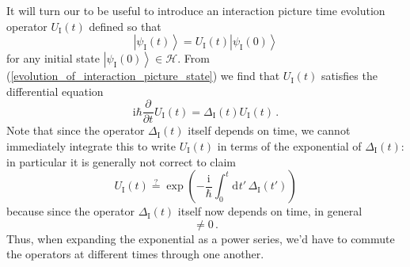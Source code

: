 \documentclass{article}
\theoremstyle{plain}\theoremheaderfont{\normalfont\itshape}\theorembodyfont{\rmfamily}\theoremseparator{.}\newtheorem*{rem}{Remark}\newtheorem*{ex}{Example}\newtheorem*{proof}{Proof}\newtheorem*{altp}{Alternative proof}
\theoremstyle{plain}\theoremheaderfont{\normalfont\bfseries}\theorembodyfont{\rmfamily}\theoremseparator{.}\newtheorem{thm}{Theorem}[section]\newtheorem{lem}[thm]{Lemma}\newtheorem{prop}[thm]{Proposition}\newtheorem*{cor}{Corollary}\newtheorem{defn}[thm]{Definition}\newtheorem{clm}[thm]{Claim}\newtheorem{clminproof}{Claim}
\theoremstyle{break}\theoremheaderfont{\normalfont\itshape}\theorembodyfont{\rmfamily}\theoremseparator{.\medskip}\newtheorem*{proofskip}{Proof}\newtheorem*{exs}{Examples}\newtheorem*{rems}{Remarks}
\theoremstyle{break}\theoremheaderfont{\normalfont\bfseries}\theorembodyfont{\rmfamily}\theoremseparator{.\medskip}\newtheorem{lemskip}[thm]{Lemma}\newtheorem{defnskip}[thm]{Definition}\newtheorem{propskip}[thm]{Proposition}\newtheorem{thmskip}[thm]{Theorem}
\numberwithin{equation}{section}
\newcommand{\ii}{\mathrm{i}}
\newcommand{\dd}[2][]{\mathrm{d}^{#1} #2\,}
\newcommand{\pdv}[3][]{\frac{\partial^{#1} #2}{{\partial #3}^{#1}}}
\newcommand{\ket}[1]{\left| #1 \right\rangle}
\newcommand{\hb}{\mathcal{H}}
\newcommand{\I}{_{\mathrm{I}}}
\begin{document}
    It will turn our to be useful to introduce an interaction picture time evolution operator \(U\I(t)\) defined so that
    \begin{equation}
        \ket{\psi\I(t)}=U\I(t)\ket{\psi\I(0)}
    \end{equation}
    for any initial state \(\ket{\psi\I(0)}\in\hb\). From (\ref{evolution_of_interaction_picture_state}) we find that \(U\I(t)\) satisfies the differential equation
    \begin{equation}\label{UI_DE}
        \ii\hbar\pdv{}{t}U\I(t)=\Delta\I(t)U\I(t)\,.
    \end{equation}
    Note that since the operator \(\Delta\I(t)\) itself depends on time, we cannot immediately integrate this to write \(U\I(t)\) in terms of the exponential of \(\Delta\I(t)\): in particular it is generally not correct to claim
    \begin{equation}\label{wrong_UI}
        U\I(t)\overset{?}{=}\exp\left(-\frac{\ii}{\hbar}\int_{0}^{t}\dd{t'}\Delta\I(t')\right)
    \end{equation}
    because since the operator \(\Delta\I(t)\) itself now depends on time, in general
    \begin{equation}
        [\Delta\I(t),\Delta\I(t')]\ne 0\,.
    \end{equation}
    Thus, when expanding the exponential as a power series, we'd have to commute the operators at different times through one another.
\end{document}
